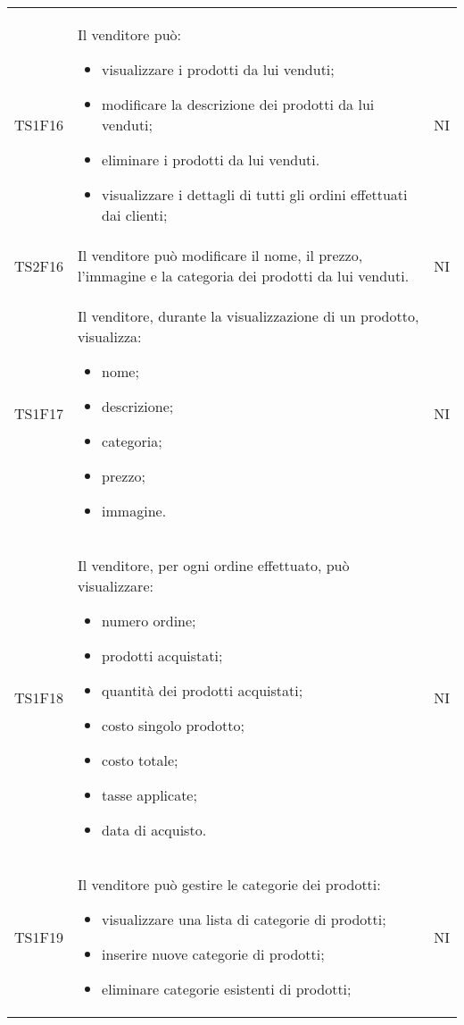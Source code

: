 {\begin{longtable}{C{3cm} C{10.2cm} C{1.5cm}}
TS1F16 & Il venditore può:
\begin{itemize}
	\item visualizzare i prodotti da lui venduti;
	\item modificare la descrizione dei prodotti da lui venduti;
	\item eliminare i prodotti da lui venduti.
	\item visualizzare i dettagli di tutti gli ordini effettuati dai clienti;
\end{itemize} & NI\\

TS2F16 & Il venditore può modificare il nome, il prezzo, l'immagine e la categoria dei prodotti da lui venduti. & NI\\

TS1F17 & Il venditore, durante la visualizzazione di un prodotto, visualizza:
\begin{itemize}
	\item nome;
	\item descrizione;
	\item categoria;
	\item prezzo;
	\item immagine.
\end{itemize} & NI\\

TS1F18 & Il venditore, per ogni ordine effettuato, può visualizzare:
\begin{itemize}
	\item numero ordine;
	\item prodotti acquistati;
	\item quantità dei prodotti acquistati;
	\item costo singolo prodotto;
	\item costo totale;
	\item tasse applicate;
	\item data di acquisto.
\end{itemize}
& NI\\

TS1F19 & Il venditore può gestire le categorie dei prodotti:
\begin{itemize}
	\item visualizzare una lista di categorie di prodotti;
	\item inserire nuove categorie di prodotti;
	\item eliminare categorie esistenti di prodotti;
\end{itemize}
& NI\\






\end{longtable}}
